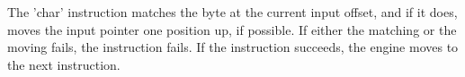 The 'char' instruction matches the byte at the current input offset,
and if it does, moves the input pointer one position up, if possible.
If either the matching or the moving fails, the instruction fails.
If the instruction succeeds, the engine moves to the next instruction.
